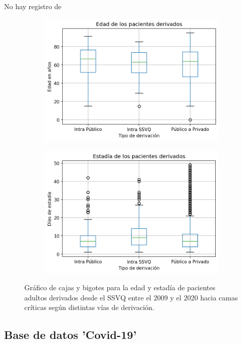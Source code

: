 \documentclass{article}
\begin{document}
No hay registro de 

\begin{figure}
	\centering
	\begin{subfigure}{.5\textwidth}
		\includegraphics[width=.8\linewidth]{./figuras/Edad_derivacion_historica.png}
	\end{subfigure}%
	\begin{subfigure}{.5\textwidth}
		\includegraphics[width=.8\linewidth]{./figuras/Estadia_derivacion_historica.png}
	\end{subfigure}
	\caption{Gráfico de cajas y bigotes para la edad y estadía de pacientes adultos derivados desde el SSVQ entre el 2009 y el 2020 hacia camas críticas según distintas vías de derivación.}
\label{fig: edadyestadia_derivaciones}
\end{figure}



\subsection{Base de datos 'Covid-19'}
\end{document}
